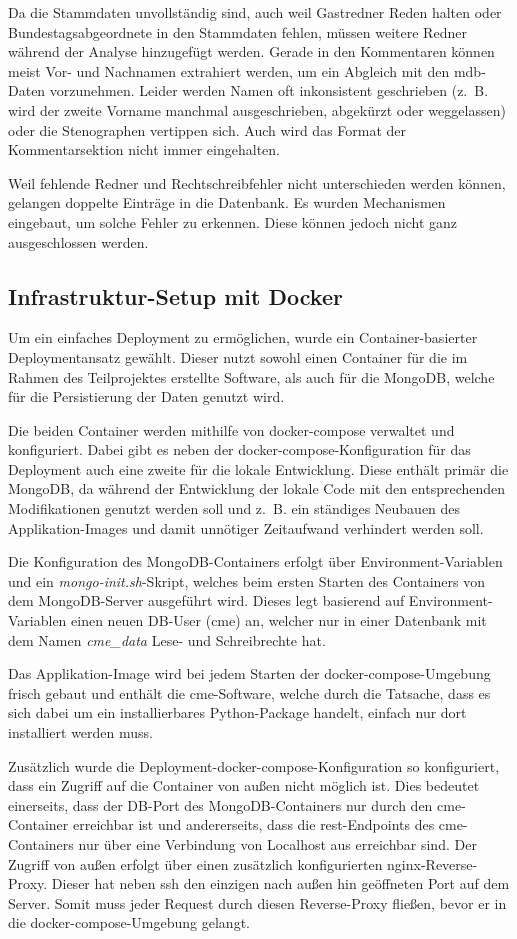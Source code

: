 Da die Stammdaten unvollständig sind, auch weil Gastredner Reden halten oder
Bundestagsabgeordnete in den Stammdaten fehlen, müssen weitere Redner während
der Analyse hinzugefügt werden. Gerade in den Kommentaren können meist Vor-
und Nachnamen extrahiert werden, um ein Abgleich mit den \gls{mdb}-Daten
vorzunehmen. Leider werden Namen oft inkonsistent geschrieben (z.~B. wird
der zweite Vorname manchmal ausgeschrieben, abgekürzt oder weggelassen) oder
die Stenographen vertippen sich. Auch wird das Format der Kommentarsektion
nicht immer eingehalten.

Weil fehlende Redner und Rechtschreibfehler nicht unterschieden werden können,
gelangen doppelte Einträge in die Datenbank. Es wurden Mechanismen eingebaut,
um solche Fehler zu erkennen. Diese können jedoch nicht ganz ausgeschlossen werden.

\subsection{Infrastruktur-Setup mit Docker}
Um ein einfaches Deployment zu ermöglichen, wurde ein Container-basierter
Deploymentansatz gewählt. Dieser nutzt sowohl einen Container für die im
Rahmen des Teilprojektes erstellte Software, als auch für die MongoDB, welche
für die Persistierung der Daten genutzt wird.

Die beiden Container werden mithilfe von docker-compose verwaltet und
konfiguriert. Dabei gibt es neben der docker-compose-Konfiguration für das
Deployment auch eine zweite für die lokale Entwicklung. Diese enthält primär
die MongoDB, da während der Entwicklung der lokale Code mit den entsprechenden
Modifikationen genutzt werden soll und z.~B. ein ständiges Neubauen des
Applikation-Images und damit unnötiger Zeitaufwand verhindert werden soll.

Die Konfiguration des MongoDB-Containers erfolgt über Environment-Variablen
und ein \textit{mongo-init.sh}-Skript, welches beim ersten Starten des
Containers von dem MongoDB-Server ausgeführt wird. Dieses legt basierend auf
Environment-Variablen einen neuen DB-User (cme) an, welcher nur in einer
Datenbank mit dem Namen \textit{cme\_data} Lese- und Schreibrechte hat.

Das Applikation-Image wird bei jedem Starten der docker-compose-Umgebung
frisch gebaut und enthält die \gls{cme}-Software, welche durch die Tatsache,
dass es sich dabei um ein installierbares Python-Package handelt, einfach nur
dort installiert werden muss.

Zusätzlich wurde die Deployment-docker-compose-Konfiguration so konfiguriert,
dass ein Zugriff auf die Container von außen nicht möglich ist. Dies bedeutet
einerseits, dass der DB-Port des MongoDB-Containers nur durch den
\gls{cme}-Container erreichbar ist und andererseits, dass die
\gls{rest}-Endpoints des \gls{cme}-Containers nur über eine Verbindung von
Localhost aus erreichbar sind. Der Zugriff von außen erfolgt über einen
zusätzlich konfigurierten nginx-Reverse-Proxy. Dieser hat neben \gls{ssh} den
einzigen nach außen hin geöffneten Port auf dem Server. Somit muss jeder
Request durch diesen Reverse-Proxy fließen, bevor er in die
docker-compose-Umgebung gelangt.

